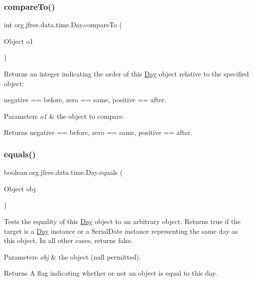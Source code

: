 \subsubsection{\texorpdfstring{compare\+To()}{compareTo()}}
{\footnotesize\ttfamily int org.\+jfree.\+data.\+time.\+Day.\+compare\+To (\begin{DoxyParamCaption}\item[{Object}]{o1 }\end{DoxyParamCaption})}

Returns an integer indicating the order of this \mbox{\hyperlink{classorg_1_1jfree_1_1data_1_1time_1_1_day}{Day}} object relative to the specified object\+:

negative == before, zero == same, positive == after.


\begin{DoxyParams}{Parameters}
{\em o1} & the object to compare.\\
\hline
\end{DoxyParams}
\begin{DoxyReturn}{Returns}
negative == before, zero == same, positive == after. 
\end{DoxyReturn}
\mbox{\label{classorg_1_1jfree_1_1data_1_1time_1_1_day_a444b56d6367d190fdafd0c04340c80b8}} 
\subsubsection{\texorpdfstring{equals()}{equals()}}
{\footnotesize\ttfamily boolean org.\+jfree.\+data.\+time.\+Day.\+equals (\begin{DoxyParamCaption}\item[{Object}]{obj }\end{DoxyParamCaption})}

Tests the equality of this \mbox{\hyperlink{classorg_1_1jfree_1_1data_1_1time_1_1_day}{Day}} object to an arbitrary object. Returns true if the target is a \mbox{\hyperlink{classorg_1_1jfree_1_1data_1_1time_1_1_day}{Day}} instance or a Serial\+Date instance representing the same day as this object. In all other cases, returns false.


\begin{DoxyParams}{Parameters}
{\em obj} & the object ({\ttfamily null} permitted).\\
\hline
\end{DoxyParams}
\begin{DoxyReturn}{Returns}
A flag indicating whether or not an object is equal to this day. 
\end{DoxyReturn}
\mbox{\label{classorg_1_1jfree_1_1data_1_1time_1_1_day_a0ef57f9f261fcb51f130323617c735b3}} 
